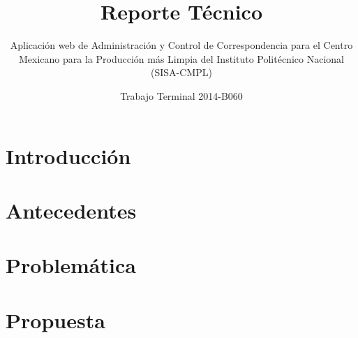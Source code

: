 \documentclass[oneside,10pt]{book}
\title{Reporte Técnico}
\subtitle{Aplicación web de Administración y Control de Correspondencia para el Centro Mexicano para la Producción más Limpia del Instituto Politécnico Nacional (SISA-CMPL)}
\author{Trabajo Terminal 2014-B060}
\begin{document}
\maketitle
\thispagestyle{empty}

\frontmatter
\tableofcontents

\mainmatter

\chapter{Introducción}


\chapter{Antecedentes}
	

\chapter{Problemática}


\chapter{Propuesta}







\end{document}
